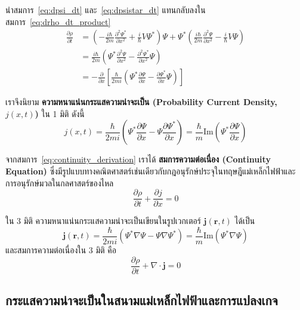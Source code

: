 นำสมการ~\eqref{eq:dpsi_dt} และ~\eqref{eq:dpsistar_dt} แทนกลับลงในสมการ~\eqref{eq:drho_dt_product}
\begin{align}
\frac{\partial \rho}{\partial t} &= \left( -\frac{i\hbar}{2m} \frac{\partial^2 \Psi^*}{\partial x^2} + \frac{i}{\hbar} V \Psi^* \right) \Psi + \Psi^* \left( \frac{i\hbar}{2m} \frac{\partial^2 \Psi}{\partial x^2} - \frac{i}{\hbar} V \Psi \right) \nonumber \\
&= \frac{i\hbar}{2m} \left( \Psi^* \frac{\partial^2 \Psi}{\partial x^2} - \frac{\partial^2 \Psi^*}{\partial x^2} \Psi \right) \nonumber \\
&= -\frac{\partial}{\partial x} \left[ \frac{\hbar}{2mi} \left( \Psi^* \frac{\partial \Psi}{\partial x} - \frac{\partial \Psi^*}{\partial x} \Psi \right) \right]
\label{eq:continuity_derivation}
\end{align}

เราจึงนิยาม \textbf{ความหนาแน่นกระแสความน่าจะเป็น (Probability Current Density, $j(x, t)$)} ใน 1 มิติ ดังนี้
\begin{equation}
j(x, t) = \frac{\hbar}{2mi} \left( \Psi^* \frac{\partial \Psi}{\partial x} - \Psi \frac{\partial \Psi^*}{\partial x} \right) = \frac{\hbar}{m} \text{Im}\left( \Psi^* \frac{\partial \Psi}{\partial x} \right)
\label{eq:prob_current_1d}
\end{equation}

จากสมการ~\eqref{eq:continuity_derivation} เราได้ \textbf{สมการความต่อเนื่อง (Continuity Equation)} ซึ่งมีรูปแบบทางคณิตศาสตร์เช่นเดียวกับกฎอนุรักษ์ประจุในทฤษฎีแม่เหล็กไฟฟ้าและการอนุรักษ์มวลในกลศาสตร์ของไหล
\begin{equation}
\frac{\partial \rho}{\partial t} + \frac{\partial j}{\partial x} = 0
\label{eq:continuity_equation}
\end{equation}

ใน 3 มิติ ความหนาแน่นกระแสความน่าจะเป็นเขียนในรูปเวกเตอร์ $\mathbf{j}(\mathbf{r}, t)$ ได้เป็น
\begin{equation}
\mathbf{j}(\mathbf{r}, t) = \frac{\hbar}{2mi} \left( \Psi^* \nabla \Psi - \Psi \nabla \Psi^* \right) = \frac{\hbar}{m} \text{Im}(\Psi^* \nabla \Psi)
\label{eq:prob_current_3d}
\end{equation}
และสมการความต่อเนื่องใน 3 มิติ คือ
\begin{equation}
\frac{\partial \rho}{\partial t} + \nabla \cdot \mathbf{j} = 0
\label{eq:continuity_3d}
\end{equation}

\subsection{กระแสความน่าจะเป็นในสนามแม่เหล็กไฟฟ้าและการแปลงเกจ}

